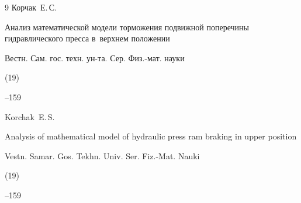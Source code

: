 \begin{thebibliography}{9}
\by Корчак~Е.\,С.

\paper Анализ математической модели торможения подвижной поперечины гидравлического пресса в~верхнем положении

\jour Вестн. Сам. гос. техн. ун-та. Сер. Физ.-мат. науки


(19)

--159

\misctransl

\by Korchak~E.\,S.

\paper Analysis of mathematical model of hydraulic press ram braking in upper position

\jour Vestn. Samar. Gos. Tekhn. Univ. Ser. Fiz.-Mat. Nauki


(19)

--159



\end{thebibliography}



\noindent

\hskip6.5cm \thedate \par\noindent

\hskip6.5cm\therevdate






%




\makeengtitle







\newpage

%


%

%

